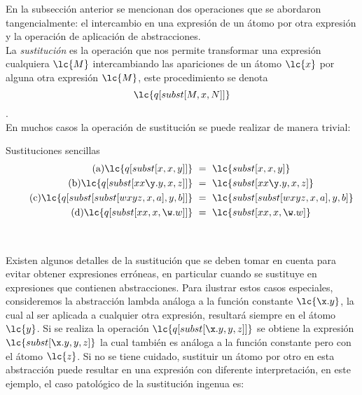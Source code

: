 En la subsección anterior se mencionan dos operaciones que se abordaron
tangencialmente: el intercambio en una expresión de un átomo por otra expresión
y la operación de aplicación de abstracciones. \\

La \emph{sustitución} es la operación que nos permite transformar una expresión
cualquiera \(\lc{M}\) intercambiando las apariciones de un átomo \(\lc{x}\) por alguna
otra expresión \(\lc{M}\), este procedimiento se denota
\[\lc{q[subst[M,x,N]]}\]. \\

En muchos casos la operación de sustitución se puede realizar de manera trivial: \\

\begin{ejemplo} Sustituciones sencillas
  \label{ejemplo:sustitucion1}
  \begin{subequations}
    \begin{align}
      \label{ejemplo:sustitucion1:a} \tag{a}
      \lc{q[subst[x,x,y]]}\ &=\ \lc{subst[x,x,y]}
      \\
      \label{ejemplo:sustitucion1:b} \tag{b}
      \lc{q[subst[x x \y.y,x,z]]}\ &=\ \lc{subst[x x \y.y,x,z]}
      \\
      \label{ejemplo:sustitucion1:c} \tag{c}
      \lc{q[subst[subst[w x y z,x,a],y,b]]}\ &=\ \lc{subst[subst[w x y z,x,a],y,b]}
      \\
      \label{ejemplo:sustitucion1:d} \tag{d}
      \lc{q[subst[x x,x,\w.w]]}\ &=\ \lc{subst[x x,x,\w.w]}
    \end{align}
  \end{subequations}
\end{ejemplo} \

Existen algunos detalles de la sustitución que se deben tomar en cuenta para
evitar obtener expresiones erróneas, en particular cuando se sustituye en
expresiones que contienen abstracciones. Para ilustrar estos casos especiales,
consideremos la abstracción lambda análoga a la función constante \(\lc{\x.y}\),
la cual al ser aplicada a cualquier otra expresión, resultará siempre en el
átomo \(\lc{y}\). Si se realiza la operación \(\lc{q[subst[\x.y,y,z]]}\) se
obtiene la expresión \(\lc{subst[\x.y,y,z]}\) la cual también es análoga a la
función constante pero con el átomo \(\lc{z}\). Si no se tiene cuidado,
sustituir un átomo por otro en esta abstracción puede resultar en una expresión
con diferente interpretación, en este ejemplo, el caso patológico de la
sustitución ingenua es: \\

